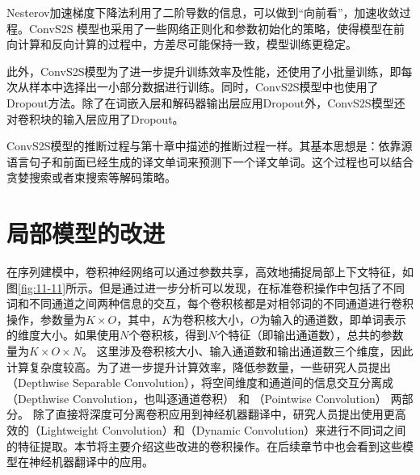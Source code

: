 \parinterval Nesterov加速梯度下降法利用了二阶导数的信息，可以做到“向前看”，加速收敛过程。ConvS2S 模型也采用了一些网络正则化和参数初始化的策略，使得模型在前向计算和反向计算的过程中，方差尽可能保持一致，模型训练更稳定。

\parinterval 此外，ConvS2S模型为了进一步提升训练效率及性能，还使用了小批量训练，即每次从样本中选择出一小部分数据进行训练。同时，ConvS2S模型中也使用了Dropout方法。除了在词嵌入层和解码器输出层应用Dropout外，ConvS2S模型还对卷积块的输入层应用了Dropout。

\parinterval ConvS2S模型的推断过程与第十章中描述的推断过程一样。其基本思想是：依靠源语言句子和前面已经生成的译文单词来预测下一个译文单词。这个过程也可以结合贪婪搜索或者束搜索等解码策略。

\sectionnewpage
\section{局部模型的改进}

\parinterval 在序列建模中，卷积神经网络可以通过参数共享，高效地捕捉局部上下文特征，如图\ref{fig:11-11}所示。但是通过进一步分析可以发现，在标准卷积操作中包括了不同词和不同通道之间两种信息的交互，每个卷积核都是对相邻词的不同通道进行卷积操作，参数量为$K \times O$，其中，$K$为卷积核大小，$O$为输入的通道数，即单词表示的维度大小。如果使用$N$个卷积核，得到$N$个特征（即输出通道数），总共的参数量为$K \times O \times N$。 这里涉及卷积核大小、输入通道数和输出通道数三个维度，因此计算复杂度较高。为了进一步提升计算效率，降低参数量，一些研究人员提出{\small{}}（Depthwise Separable Convolution），将空间维度和通道间的信息交互分离成{\small{}}（Depthwise Convolution，也叫逐通道卷积） 和{\small{}} （Pointwise Convolution） 两部分。 除了直接将深度可分离卷积应用到神经机器翻译中，研究人员提出使用更高效的{\small{}}（Lightweight Convolution）和{\small{}}（Dynamic Convolution）来进行不同词之间的特征提取。本节将主要介绍这些改进的卷积操作。在后续章节中也会看到这些模型在神经机器翻译中的应用。

